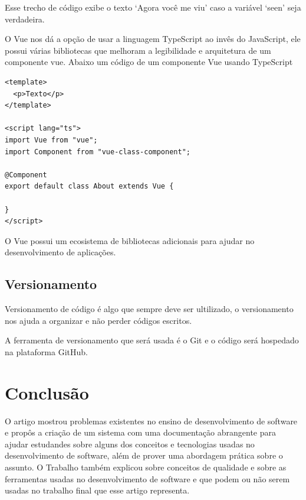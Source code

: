 \documentclass[12pt]{article}
\begin{document}
Esse trecho de código exibe o texto `Agora você me viu' caso a variável `seen' seja verdadeira.

O Vue nos dá a opção de usar a linguagem TypeScript ao invês do JavaScript, ele possui
várias bibliotecas que melhoram a legibilidade e arquitetura de um componente vue.
Abaixo um código de um componente Vue usando TypeScript

\begin{verbatim}
<template>
  <p>Texto</p>
</template>

<script lang="ts">
import Vue from "vue";
import Component from "vue-class-component";

@Component
export default class About extends Vue {
  
}
</script>
\end{verbatim}

O Vue possui um ecosistema de bibliotecas adicionais para ajudar no desenvolvimento de aplicações.

\subsection{Versionamento}

Versionamento de código é algo que sempre deve ser ultilizado, o versionamento nos ajuda a
organizar e não perder códigos escritos.

A ferramenta de versionamento que será usada é o Git e o código será hospedado na plataforma GitHub.

\section{Conclusão}

O artigo mostrou problemas existentes no ensino de desenvolvimento de software e propôs
a criação de um sistema com uma documentação abrangente para ajudar estudandes sobre alguns dos
conceitos e tecnologias usadas no desenvolvimento de software, além de prover uma abordagem prática
sobre o assunto. O Trabalho também explicou sobre conceitos de qualidade e sobre as ferramentas usadas
no desenvolvimento de software e que podem ou não serem usadas no trabalho final
que esse artigo representa.


\end{document}
